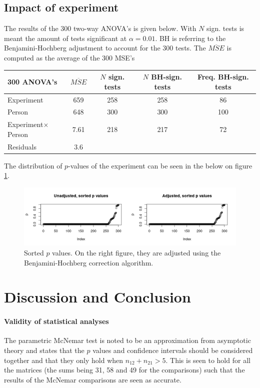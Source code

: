 \documentclass[11pt,fleqn]{article}
\begin{document}
\subsection{Impact of experiment}
The results of the 300 two-way ANOVA's is given below. With \(N\) sign. tests is meant the amount of tests significant at \(\alpha = 0.01\). BH is referring to the Benjamini-Hochberg adjustment to account for the 300 tests. The \(\overline{ MSE}\) is computed as the average of the 300 MSE's
\begin{table}[H]
	\centering
	\begin{tabular}{l | c c c c}
		300 ANOVA's & \(\overline{MSE}\) & \(N\) sign. tests& \(N\) BH-sign. tests& Freq. BH-sign. tests\\
		\hline 
		Experiment  & 659 	& 258 & 258 	& 86\pro	\\
		Person  & 648 		&  300 & 300	&100\pro  \\
		Experiment\(\times\)Person&7.61  & 218 & 217 &	72\pro	\\
		Residuals &3.6 &			
	\end{tabular}
	\label{tab:ranova}
\end{table}\noindent
The distribution of \(p\)-values of the experiment can be seen in the below on figure \ref{fig:sortp}.
\begin{figure}[H]
	\centering
	\includegraphics[width=.8\textwidth]{pvalues}
	\caption{Sorted $ p $ values. On the right figure, they are adjusted using the Benjamini-Hochberg correction algorithm.}\label{fig:sortp}
\end{figure}

\section{Discussion and Conclusion}
\paragraph{Validity of statistical analyses}
The parametric McNemar test is noted to be an approximation from asymptotic theory and \cite{Tue} states that the \(p\) values and confidence intervals should be considered together and that they only hold when \(n_{12}+n_{21}> 5\). This is seen to hold for all the matrices (the sums being 31, 58 and 49 for the comparisons) such that the results of the McNemar comparisons are seen as accurate.
\end{document}
